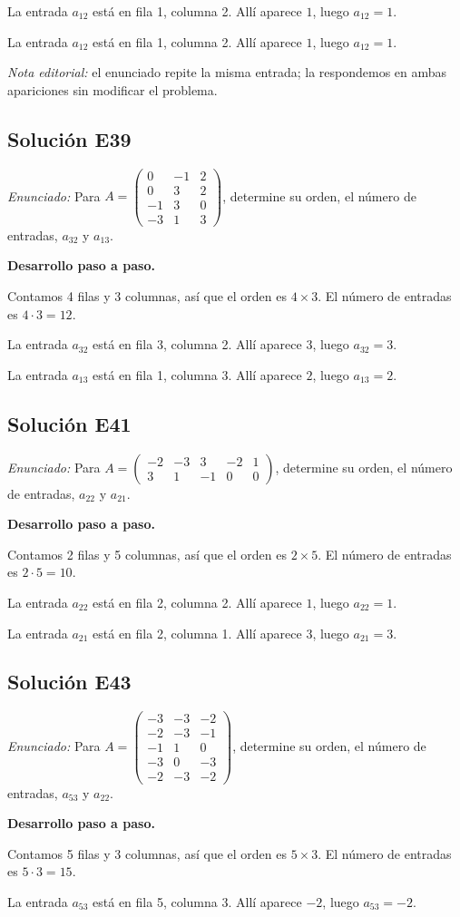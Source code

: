 \documentclass[12pt]{article}
\theoremstyle{remark}
\newcommand{\solucion}[2]{\Needspace{11\baselineskip}\subsection*{Solución E#1}\noindent\textit{Enunciado:} #2\par\medskip\noindent\textbf{Desarrollo paso a paso.}\par\medskip}
\begin{document}
La entrada $a_{12}$ está en fila 1, columna 2. Allí aparece $1$, luego $\boxed{a_{12}=1}$.

La entrada $a_{12}$ está en fila 1, columna 2. Allí aparece $1$, luego $\boxed{a_{12}=1}$.

\emph{Nota editorial:} el enunciado repite la misma entrada; la respondemos en ambas apariciones sin modificar el problema.


\medskip

\solucion{39}{Para $A=\begin{pmatrix}0&-1&2\\0&3&2\\-1&3&0\\-3&1&3\end{pmatrix}$, determine su orden, el número de entradas, $a_{32}$ y $a_{13}$.}
Contamos 4 filas y 3 columnas, así que el orden es $4\times3$. El número de entradas es $4\cdot 3=12$.

La entrada $a_{32}$ está en fila 3, columna 2. Allí aparece $3$, luego $\boxed{a_{32}=3}$.

La entrada $a_{13}$ está en fila 1, columna 3. Allí aparece $2$, luego $\boxed{a_{13}=2}$.


\medskip

\solucion{41}{Para $A=\begin{pmatrix}-2&-3&3&-2&1\\3&1&-1&0&0\end{pmatrix}$, determine su orden, el número de entradas, $a_{22}$ y $a_{21}$.}
Contamos 2 filas y 5 columnas, así que el orden es $2\times5$. El número de entradas es $2\cdot 5=10$.

La entrada $a_{22}$ está en fila 2, columna 2. Allí aparece $1$, luego $\boxed{a_{22}=1}$.

La entrada $a_{21}$ está en fila 2, columna 1. Allí aparece $3$, luego $\boxed{a_{21}=3}$.


\medskip

\solucion{43}{Para $A=\begin{pmatrix}-3&-3&-2\\-2&-3&-1\\-1&1&0\\-3&0&-3\\-2&-3&-2\end{pmatrix}$, determine su orden, el número de entradas, $a_{53}$ y $a_{22}$.}
Contamos 5 filas y 3 columnas, así que el orden es $5\times3$. El número de entradas es $5\cdot 3=15$.

La entrada $a_{53}$ está en fila 5, columna 3. Allí aparece $-2$, luego $\boxed{a_{53}=-2}$.
\end{document}
